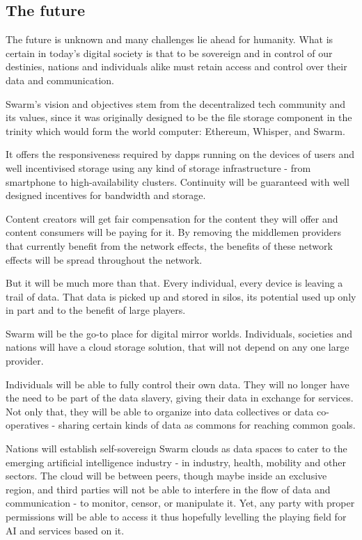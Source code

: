 \subsection{The future} \label{sec:future}

The future is unknown and many challenges lie ahead for humanity. What is certain in today's digital society is that to be sovereign and in control of our destinies, nations and individuals alike must retain access and control over their data and communication.

Swarm's vision and objectives stem from the decentralized tech community and its values, since it was originally designed to be the file storage component in the trinity which would form the world computer: Ethereum, Whisper, and Swarm.

It offers the responsiveness required by dapps running on the devices of users and well incentivised storage using any kind of storage infrastructure - from smartphone to high-availability clusters. Continuity will be guaranteed with well designed incentives for bandwidth and storage.

Content creators will get fair compensation for the content they will offer and content consumers will be paying for it. By removing the middlemen providers that currently benefit from the network effects, the benefits of these network effects will be spread throughout the network.

But it will be much more than that. Every individual, every device is leaving a trail of data. That data is picked up and stored in silos, its potential used up only in part and to the benefit of large players.

Swarm will be the go-to place for digital mirror worlds. Individuals, societies and nations will have a cloud storage solution, that will not depend on any one large provider. 


Individuals will be able to fully control their own data. They will no longer have the need to be part of the data slavery, giving their data in exchange for services. Not only that, they will be able to organize into data collectives or data co-operatives - sharing certain kinds of data as commons for reaching common goals. 

Nations will establish self-sovereign Swarm clouds as data spaces to cater to the emerging artificial intelligence industry - in industry, health, mobility and other sectors. The cloud will be between peers, though maybe inside an exclusive region, and third parties will not be able to interfere in the flow of data and communication - to monitor, censor,  or manipulate it. Yet, any party with proper permissions will be able to access it thus hopefully levelling the playing field for AI and services based on it.  

